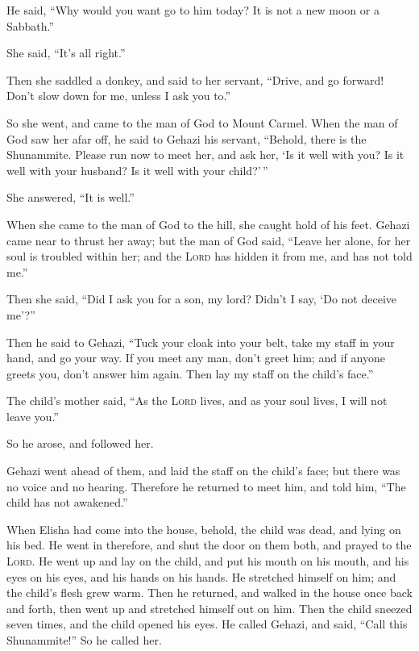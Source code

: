  He said, ``Why would you want go to him today? It is not
a new moon or a Sabbath.''

She said, ``It's all right.''

 Then she saddled a donkey, and said to her servant,
``Drive, and go forward! Don't slow down for me, unless I ask you to.''

 So she went, and came to the man of God to Mount Carmel.
When the man of God saw her afar off, he said to Gehazi his servant,
``Behold, there is the Shunammite.  Please run now to
meet her, and ask her, `Is it well with you? Is it well with your
husband? Is it well with your child?'\,''

She answered, ``It is well.''

 When she came to the man of God to the hill, she caught
hold of his feet. Gehazi came near to thrust her away; but the man of
God said, ``Leave her alone, for her soul is troubled within her; and
the \textsc{Lord} has hidden it from me, and has not told me.''

 Then she said, ``Did I ask you for a son, my lord?
Didn't I say, `Do not deceive me'?''

 Then he said to Gehazi, ``Tuck your cloak into your
belt, take my staff in your hand, and go your way. If you meet any man,
don't greet him; and if anyone greets you, don't answer him again. Then
lay my staff on the child's face.''

 The child's mother said, ``As the \textsc{Lord} lives,
and as your soul lives, I will not leave you.''

So he arose, and followed her.

 Gehazi went ahead of them, and laid the staff on the
child's face; but there was no voice and no hearing. Therefore he
returned to meet him, and told him, ``The child has not awakened.''

 When Elisha had come into the house, behold, the child
was dead, and lying on his bed.  He went in therefore,
and shut the door on them both, and prayed to the \textsc{Lord}.
 He went up and lay on the child, and put his mouth on
his mouth, and his eyes on his eyes, and his hands on his hands. He
stretched himself on him; and the child's flesh grew warm.
 Then he returned, and walked in the house once back and
forth, then went up and stretched himself out on him. Then the child
sneezed seven times, and the child opened his eyes.  He
called Gehazi, and said, ``Call this Shunammite!'' So he called her.

